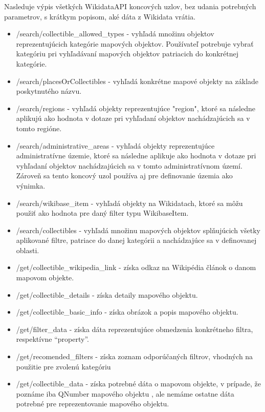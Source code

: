 Nasleduje výpis všetkých WikidataAPI koncových uzlov, bez udania potrebných parametrov, s krátkym popisom, aké dáta z Wikidata vrátia. 

\begin{itemize}
      \item /search/collectible\_allowed\_types - vyhľadá množinu objektov reprezentujúcich kategórie mapových objektov. 
            Používateľ potrebuje vybrať kategóriu pri vyhľadávaní mapových objektov patriacich do konkrétnej kategórie. 
      \item /search/placesOrCollectibles - vyhľadá konkrétne mapové objekty na základe poskytnutého názvu. 
      \item /search/regions - vyhľadá objekty reprezentujúce "region", ktoré sa následne aplikujú ako hodnota v dotaze pri vyhľadaní objektov nachádzajúcich sa v tomto regióne. 
      \item /search/administrative\_areas - vyhľadá objekty reprezentujúce administratívne územie, ktoré sa následne 
            aplikuje ako hodnota v dotaze pri vyhľadaní objektov nachádzajúcich sa v tomto administratívnom území. Zároveň sa tento koncový uzol používa aj pre definovanie územia ako výnimka. 
      \item /search/wikibase\_item - vyhľadá objekty na Wikidatach, ktoré sa môžu použiť ako hodnota pre daný filter typu WikibaseItem. 
      \item /search/collectibles - vyhľadá množinu mapových objektov splňujúcich všetky aplikované filtre, patriace do danej kategórii a nachádzajúce sa v definovanej oblasti. 
      \item /get/collectible\_wikipedia\_link - získa odkaz na Wikipédia článok o danom mapovom objekte. 
      \item /get/collectible\_details - získa detaily mapového objektu. 
      \item /get/collectible\_basic\_info - získa obrázok a popis mapového objektu. 
      \item /get/filter\_data - získa dáta reprezentujúce obmedzenia konkrétneho filtra, respektívne “property”. 
      \item /get/recomended\_filters - získa zoznam odporúčaných filtrov, vhodných na použitie pre zvolenú kategóriu 
      \item /get/collectible\_data - získa potrebné dáta o mapovom objekte, v prípade, že poznáme iba QNumber mapového objektu , ale nemáme ostatne dáta potrebné pre reprezentovanie mapového objektu. 
\end{itemize}

